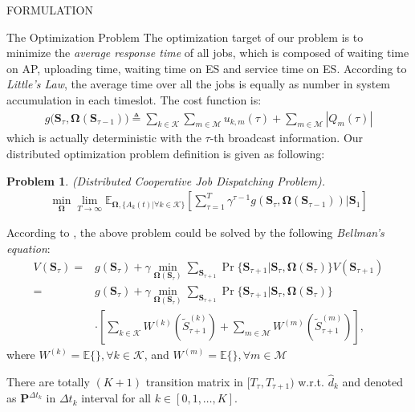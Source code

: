 \documentclass[10pt, conference, letterpaper]{IEEEtran}
\newtheorem{problem}{Problem}
\newcommand{\mat}{\mathbf}
\newcommand{\define}{\triangleq}
\newcommand{\apSet}{\mathcal{K}}
\newcommand{\esSet}{\mathcal{M}}
\newcommand{\Stat}{\mathbf{S}}
\newcommand{\Policy}{\mathbf{\Omega}}
\begin{document}
\begin{section}{FORMULATION}
        \begin{subsection}{The Optimization Problem}
            The optimization target of our problem is to minimize the \emph{average response time} of all jobs, which is composed of waiting time on AP, uploading time, waiting time on ES and service time on ES. According to \emph{Little's Law}, the average time over all the jobs is equally as number in system accumulation in each timeslot. The cost function is:
            \begin{align}
                g\bigg(\Stat_\tau, \Policy(\Stat_{\tau-1})\bigg) \define \sum_{k\in\apSet}\sum_{m\in\esSet} u_{k,m}(\tau) + \sum_{m\in\esSet}|Q_m(\tau)| 
            \end{align}
            which is actually deterministic with the $\tau$-th broadcast information.
            Our distributed optimization problem definition is given as following:
            \begin{problem}
                (Distributed Cooperative Job Dispatching Problem).
                \begin{gather}
                    \min_{\Policy} \lim_{T \to \infty}
                        \mathbb{E}_{\Policy, \{A_k(t)|\forall k\in\apSet\}}
                            [\sum_{\tau=1}^{T} \gamma^{\tau-1} g(\Stat_\tau, \Policy(\Stat_{\tau-1}))|\Stat_1]
                \end{gather}
            \end{problem}

            According to \cite{sutton1998introduction}, the above problem could be solved by the following \emph{Bellman's equation}:
            \begin{align}
                V(\Stat_{\tau}) =& g(\Stat_\tau) +\gamma \min_{\Policy(\Stat_\tau)} \sum_{\Stat_{\tau+1}} \Pr\{\Stat_{\tau+1}|\Stat_{\tau}, \Policy(\Stat_\tau)\} V(\Stat_{\tau+1})
                \nonumber\\
                =& g(\Stat_\tau) +\gamma \min_{\Policy(\Stat_\tau)} \sum_{\Stat_{\tau+1}} \Pr\{\Stat_{\tau+1}|\Stat_{\tau}, \Policy(\Stat_\tau)\}
                \nonumber\\
               & \cdot [\sum_{k\in\apSet} {W}^{(k)}(\tilde{S}^{(k)}_{\tau+1}) + \sum_{m\in\esSet} {W}^{(m)}(\tilde{S}^{(m)}_{\tau+1})],
            \end{align}
            where $W^{(k)}=\mathbb{E}\{\}, \forall k\in\apSet$, and $W^{(m)}=\mathbb{E}\{\}, \forall m\in\esSet$

            There are totally $(K+1)$ transition matrix in $[T_{\tau}, T_{\tau+1})$ w.r.t. $\hat{d}_k$ and denoted as $\mat{P}^{\Delta{t}_k}$ in $\Delta{t}_k$ interval for all $k\in[0,1,\dots,K]$.
        \end{subsection}
    \end{section}
\end{document}
